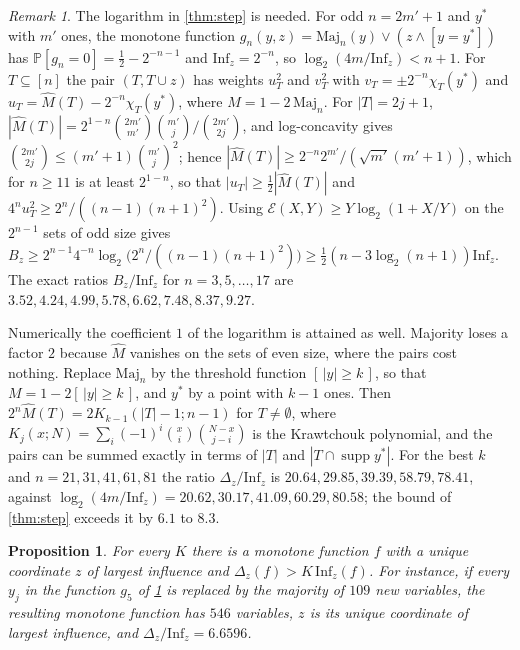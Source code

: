 \documentclass[11pt]{amsart}
\newtheorem{proposition}[theorem]{Proposition}
\theoremstyle{remark}
\newtheorem{remark}[theorem]{Remark}
\renewcommand{\Pr}{\mathbb{P}}
\newcommand{\Inf}{\mathrm{Inf}}
\begin{document}
\begin{remark}\label{rem:log}
The logarithm in \cref{thm:step} is needed. For odd $n=2m'+1$ and $y^*$ with $m'$ ones, the monotone function
$g_n(y,z)=\mathrm{Maj}_n(y)\vee(z\wedge[y=y^*])$ has $\Pr[g_n=0]=\frac12-2^{-n-1}$ and $\Inf_z=2^{-n}$, so
$\log_2(4m/\Inf_z)<n+1$. For $T\subseteq[n]$ the pair $(T,T\cup z)$ has weights $u_T^2$ and $v_T^2$ with
$v_T=\pm2^{-n}\chi_T(y^*)$ and $u_T=\widehat{M}(T)-2^{-n}\chi_T(y^*)$, where $M=1-2\,\mathrm{Maj}_n$. For $|T|=2j+1$,
$|\widehat M(T)|=2^{1-n}\binom{2m'}{m'}\binom{m'}{j}/\binom{2m'}{2j}$, and log-concavity gives
$\binom{2m'}{2j}\le(m'+1)\binom{m'}{j}^2$; hence $|\widehat M(T)|\ge2^{-n}2^{m'}/(\sqrt{m'}(m'+1))$, which for
$n\ge11$ is at least $2^{1-n}$, so that $|u_T|\ge\frac12|\widehat M(T)|$ and $4^nu_T^2\ge2^n/((n-1)(n+1)^2)$. Using
$\mathcal E(X,Y)\ge Y\log_2(1+X/Y)$ on the $2^{n-1}$ sets of odd size gives
$B_z\ge2^{n-1}4^{-n}\log_2\bigl(2^n/((n-1)(n+1)^2)\bigr)\ge\frac12(n-3\log_2(n+1))\Inf_z$. The exact ratios
$B_z/\Inf_z$ for $n=3,5,\dots,17$ are $3.52,4.24,4.99,5.78,6.62,7.48,8.37,9.27$.

Numerically the coefficient $1$ of the logarithm is attained as well. Majority loses a factor $2$ because
$\widehat M$ vanishes on the sets of even size, where the pairs cost nothing. Replace $\mathrm{Maj}_n$ by the threshold
function $[\,|y|\ge k\,]$, so that $M=1-2[\,|y|\ge k\,]$, and $y^*$ by a point with $k-1$ ones. Then
$2^n\widehat M(T)=2K_{k-1}(|T|-1;n-1)$ for $T\neq\emptyset$,
where $K_j(x;N)=\sum_i(-1)^i\binom xi\binom{N-x}{j-i}$ is the Krawtchouk polynomial, and the pairs can be summed exactly
in terms of $|T|$ and $|T\cap\operatorname{supp}y^*|$. For the best $k$ and $n=21,31,41,61,81$ the ratio $\Delta_z/\Inf_z$ is
$20.64,29.85,39.39,58.79,78.41$, against $\log_2(4m/\Inf_z)=20.62,30.17,41.09,60.29,80.58$; the bound of
\cref{thm:step} exceeds it by $6.1$ to $8.3$.
\end{remark}

\begin{proposition}\label{prop:maxinf}
For every $K$ there is a monotone function $f$ with a unique coordinate $z$ of largest influence and
$\Delta_z(f)>K\,\Inf_z(f)$. For instance, if every $y_j$ in the function $g_5$ of \cref{rem:log} is replaced by the majority
of $109$ new variables, the resulting monotone function has $546$ variables, $z$ is its unique coordinate of largest
influence, and $\Delta_z/\Inf_z=6.6596$.
\end{proposition}
\end{document}
